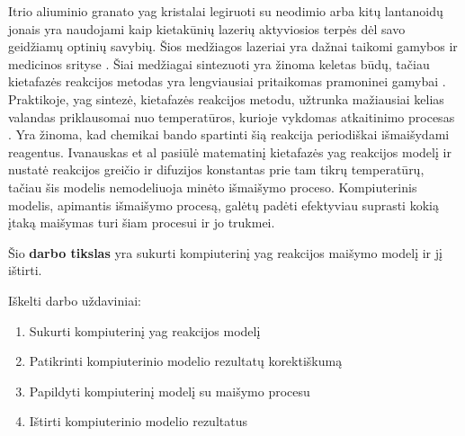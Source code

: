 




Itrio aliuminio granato \acs{yag} kristalai legiruoti su neodimio arba kitų lantanoidų jonais yra naudojami kaip kietakūnių lazerių aktyviosios terpės dėl savo geidžiamų optinių savybių. Šios medžiagos lazeriai yra dažnai taikomi gamybos ir medicinos srityse \cite{dubeyExperimentalStudyNd2008, valentiUseErYAG2021}. Šiai medžiagai sintezuoti yra žinoma keletas būdų, tačiau kietafazės reakcijos metodas yra lengviausiai pritaikomas pramoninei gamybai \cite{bhattacharyyaMethodsSynthesisY3AI5O122007, zhangNovelSynthesisYAG2005}. Praktikoje, \acs{yag} sintezė, kietafazės reakcijos metodu, užtrunka mažiausiai kelias valandas priklausomai nuo temperatūros, kurioje vykdomas atkaitinimo procesas \cite{mackeviciusCloserLookComputer2012}. Yra žinoma, kad chemikai bando spartinti šią reakcija periodiškai išmaišydami reagentus. Ivanauskas et al \cite{ivanauskasModellingSolidState2005} pasiūlė matematinį kietafazės \acs{yag} reakcijos modelį ir nustatė reakcijos greičio ir difuzijos konstantas prie tam tikrų temperatūrų, tačiau šis modelis nemodeliuoja minėto išmaišymo proceso. Kompiuterinis modelis, apimantis išmaišymo procesą, galėtų padėti efektyviau suprasti kokią įtaką maišymas turi šiam procesui ir jo trukmei.

Šio \textbf{darbo tikslas} yra sukurti kompiuterinį \acs{yag} reakcijos maišymo modelį ir jį ištirti.

Iškelti darbo uždaviniai:

\begin{enumerate}
\item Sukurti kompiuterinį \acs{yag} reakcijos modelį
\item Patikrinti kompiuterinio modelio rezultatų korektiškumą
\item Papildyti kompiuterinį modelį su maišymo procesu
\item Ištirti kompiuterinio modelio rezultatus
\end{enumerate}